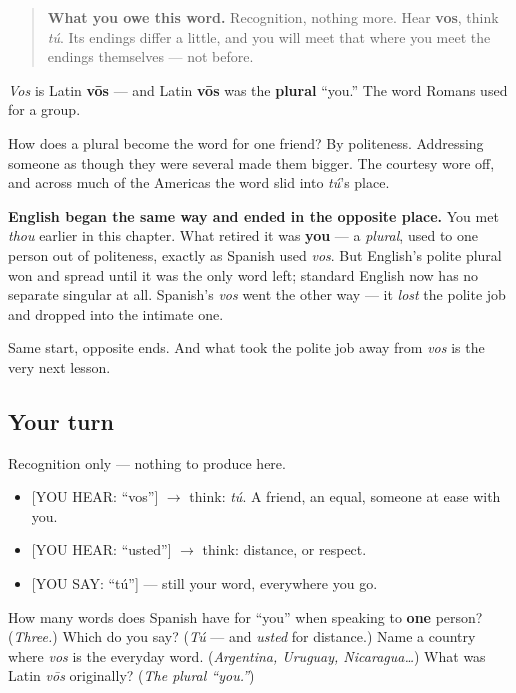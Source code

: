 \begin{quote}
\textbf{What you owe this word.} Recognition, nothing more. Hear \textbf{vos}, think \emph{tú}. Its endings differ a little, and you will meet that where you meet the endings themselves — not before.
\end{quote}

\begin{cousinweb}
\emph{Vos} is Latin \textbf{vōs} — and Latin \textbf{vōs} was the \textbf{plural} \textquotedblleft{}you.\textquotedblright{} The word Romans used for a group.

How does a plural become the word for one friend? By politeness. Addressing someone as though they were several made them bigger. The courtesy wore off, and across much of the Americas the word slid into \emph{tú}'s place.

\textbf{English began the same way and ended in the opposite place.} You met \emph{thou} earlier in this chapter. What retired it was \textbf{you} — a \emph{plural}, used to one person out of politeness, exactly as Spanish used \emph{vos}. But English's polite plural won and spread until it was the only word left; standard English now has no separate singular at all. Spanish's \emph{vos} went the other way — it \emph{lost} the polite job and dropped into the intimate one.

Same start, opposite ends. And what took the polite job away from \emph{vos} is the very next lesson.
\end{cousinweb}

\subsection*{Your turn}
Recognition only — nothing to produce here.

\begin{itemize}
\raggedright
  \item {[}YOU HEAR: \textquotedblleft{}vos\textquotedblright{}{]} $\to$ think: \emph{tú}. A friend, an equal, someone at ease with you.
  \item {[}YOU HEAR: \textquotedblleft{}usted\textquotedblright{}{]} $\to$ think: distance, or respect.
  \item {[}YOU SAY: \textquotedblleft{}tú\textquotedblright{}{]} — still your word, everywhere you go.
\end{itemize}

\begin{tcolorbox}[breakable,colback=teal!4,colframe=teal!35!black,title={Before you move on}]
How many words does Spanish have for \textquotedblleft{}you\textquotedblright{} when speaking to \textbf{one} person? (\emph{Three.}) Which do you say? (\emph{Tú} — and \emph{usted} for distance.) Name a country where \emph{vos} is the everyday word. (\emph{Argentina, Uruguay, Nicaragua…}) What was Latin \emph{vōs} originally? (\emph{The plural \textquotedblleft{}you.\textquotedblright{}})
\end{tcolorbox}
